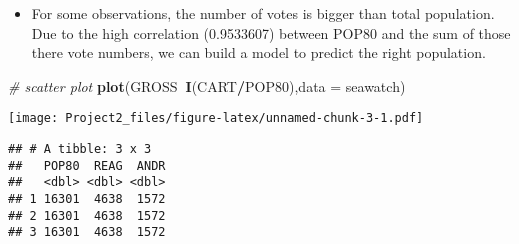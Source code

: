 \documentclass[]{article}
\newenvironment{Shaded}{\begin{snugshade}}{\end{snugshade}}
\newcommand{\KeywordTok}[1]{\textcolor[rgb]{0.13,0.29,0.53}{\textbf{#1}}}
\newcommand{\DataTypeTok}[1]{\textcolor[rgb]{0.13,0.29,0.53}{#1}}
\newcommand{\StringTok}[1]{\textcolor[rgb]{0.31,0.60,0.02}{#1}}
\newcommand{\CommentTok}[1]{\textcolor[rgb]{0.56,0.35,0.01}{\textit{#1}}}
\newcommand{\OperatorTok}[1]{\textcolor[rgb]{0.81,0.36,0.00}{\textbf{#1}}}
\newcommand{\NormalTok}[1]{#1}
\providecommand{\tightlist}{%
  \setlength{\itemsep}{0pt}\setlength{\parskip}{0pt}}
\begin{document}
\begin{itemize}
\tightlist
\item
  For some observations, the number of votes is bigger than total
  population. Due to the high correlation (0.9533607) between POP80 and
  the sum of those there vote numbers, we can build a model to predict
  the right population.
\end{itemize}

\begin{Shaded}
\begin{Highlighting}[]
\CommentTok{# scatter plot}
\KeywordTok{plot}\NormalTok{(GROSS}\OperatorTok{~}\KeywordTok{I}\NormalTok{(CART}\OperatorTok{/}\NormalTok{POP80),}\DataTypeTok{data =}\NormalTok{ seawatch)}
\end{Highlighting}
\end{Shaded}

\texttt{[image: Project2\_files/figure-latex/unnamed-chunk-3-1.pdf]}

\begin{Shaded}
\end{Shaded}

\begin{verbatim}
## # A tibble: 3 x 3
##   POP80  REAG  ANDR
##   <dbl> <dbl> <dbl>
## 1 16301  4638  1572
## 2 16301  4638  1572
## 3 16301  4638  1572
\end{verbatim}

\begin{Shaded}
\end{Shaded}
\end{document}
